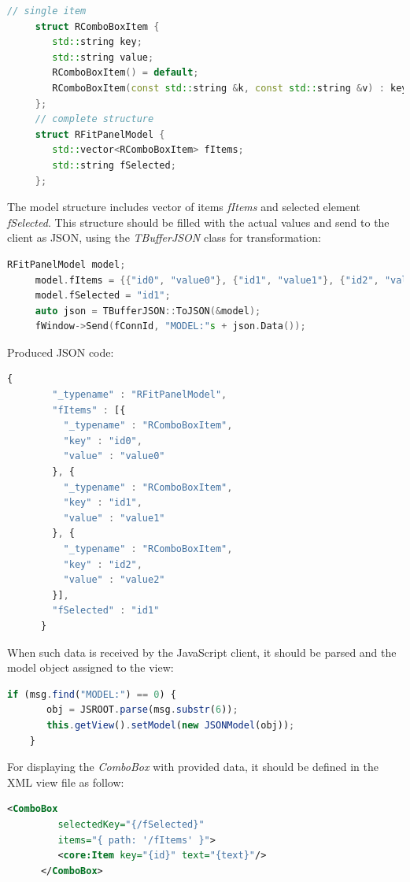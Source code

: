 \documentclass[a4paper]{jpconf}
\begin{document}
\begin{lstlisting}[language=C++,numbers=none]
     // single item
     struct RComboBoxItem {
        std::string key;
        std::string value;
        RComboBoxItem() = default;
        RComboBoxItem(const std::string &k, const std::string &v) : key(k), value(v) {}
     };
     // complete structure
     struct RFitPanelModel {
        std::vector<RComboBoxItem> fItems;
        std::string fSelected;
     };
\end{lstlisting}

The model structure includes vector of items \textit{fItems} and selected element \textit{fSelected}.
This structure should be filled with the actual values and send to the client as JSON, using the \textit{TBufferJSON} class for transformation:

\begin{lstlisting}[language=C++,numbers=none]
     RFitPanelModel model;
     model.fItems = {{"id0", "value0"}, {"id1", "value1"}, {"id2", "value2"}};
     model.fSelected = "id1";
     auto json = TBufferJSON::ToJSON(&model);
     fWindow->Send(fConnId, "MODEL:"s + json.Data());
\end{lstlisting}

Produced JSON code:

\begin{lstlisting}[language=JavaScript,numbers=none]
      {
        "_typename" : "RFitPanelModel",
        "fItems" : [{
          "_typename" : "RComboBoxItem",
          "key" : "id0",
          "value" : "value0"
        }, {
          "_typename" : "RComboBoxItem",
          "key" : "id1",
          "value" : "value1"
        }, {
          "_typename" : "RComboBoxItem",
          "key" : "id2",
          "value" : "value2"
        }],
        "fSelected" : "id1"
      }
\end{lstlisting}

When such data is received by the JavaScript client, it should be parsed and the model object assigned to the view:

\begin{lstlisting}[language=JavaScript,numbers=none]
    if (msg.find("MODEL:") == 0) {
       obj = JSROOT.parse(msg.substr(6));
       this.getView().setModel(new JSONModel(obj));
    }
\end{lstlisting}

For displaying the \textit{ComboBox} with provided data, it should be defined in the XML view file as follow:

\begin{lstlisting}[language=XML,numbers=none]
      <ComboBox
         selectedKey="{/fSelected}"
         items="{ path: '/fItems' }">
         <core:Item key="{id}" text="{text}"/>
      </ComboBox>
\end{lstlisting}
\end{document}
